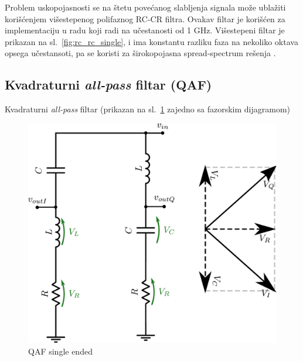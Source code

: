 \documentclass[journal,twocolumn,letterpaper]{IEEEJERM}
\begin{document}
Problem uskopojasnosti se na štetu povećanog slabljenja signala može ublažiti korišćenjem višestepenog polifaznog RC-CR filtra. Ovakav filtar je korišćen za implementaciju u radu koji radi na učestanosti od 1 GHz. Višestepeni filtar je prikazan na sl.~\ref{fig:rc_rc_single}, i ima konstantu razliku faza na nekoliko oktava opsega učestansoti, pa se koristi za širokopojasna spread-spectrum rešenja \cite{chua98}.

\subsection{Kvadraturni \textit{all-pass} filtar (QAF)}

Kvadraturni \textit{all-pass} filtar (prikazan na sl.~\ref{fig:qaf_single_ended} zajedno sa fazorskim dijagramom)

\begin{figure}[!htbp]
  \centering
  \includegraphics[width=0.8\linewidth]{qaf_single_ended.pdf}
  \caption{QAF single ended}
  \label{fig:qaf_single_ended}
\end{figure}
\end{document}
